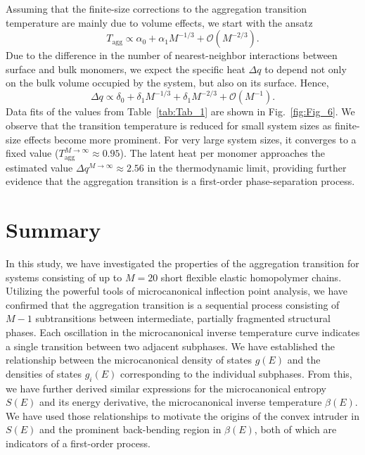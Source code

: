\documentclass[12pt]{report}
\begin{document}
Assuming that the finite-size corrections to the aggregation transition
temperature
are mainly due to volume effects, we start with the ansatz
%
\begin{equation}
T_{\mathrm{agg}} \propto \alpha_{0} + \alpha_{1}M^{-1/3}
+\mathcal{O}(M^{-2/3}).
\end{equation}
%
Due to the difference in the number of nearest-neighbor interactions
between 
surface and bulk monomers, we expect the specific heat $\Delta q$ to depend
not only on the bulk volume occupied by the system, but also on its
surface. Hence,
%
\begin{equation}
\Delta q \propto \delta_{0} + \delta_{1}M^{-1/3} + \delta_{1}M^{-2/3} + 
\mathcal{O}(M^{-1}).
\end{equation}
%
Data fits of the values from Table~\ref{tab:Tab_1} are shown in
Fig.~\ref{fig:Fig_6}. We observe
that the transition temperature is reduced for small system sizes
as finite-size effects become more prominent. For very large system sizes,
it converges to a fixed
value ($T_\mathrm{agg}^{M\to \infty}\approx 0.95$). The latent heat per
monomer approaches the estimated value $\Delta q^{M\to \infty}\approx 2.56$
in the thermodynamic limit, providing further evidence that the aggregation
transition
is a first-order phase-separation process.
%
\section{Summary}
\label{sec:sum}
%
In this study, we have investigated the properties of the aggregation
transition for systems consisting of up to $M = 20$ short flexible elastic
homopolymer chains. Utilizing the powerful tools of microcanonical
inflection point analysis, we have confirmed that the aggregation
transition is a sequential process consisting of $M-1$ subtransitions
between intermediate, partially fragmented structural phases. Each
oscillation in the microcanonical inverse temperature curve indicates a
single transition between two adjacent subphases. We have established the
relationship between the microcanonical density of states $g(E)$ and the
densities of states $g_{i}(E)$ corresponding to the individual subphases.
From this, we have further derived similar expressions for the
microcanonical entropy $S(E)$ and its energy derivative, the microcanonical
inverse temperature $\beta(E)$. We have used those relationships to
motivate the origins of the convex intruder in $S(E)$ and the prominent
back-bending region in $\beta(E)$, both of which are indicators of a
first-order process.
\end{document}
